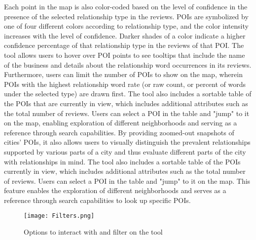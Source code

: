 Each point in the map is also color-coded based on the level of confidence in the presence of the selected relationship type in the reviews. POIs are symbolized by one of four different colors according to relationship type, and the color intensity increases with the level of confidence. Darker shades of a color indicate a higher confidence percentage of that relationship type in the reviews of that POI. The tool allows users to hover over POI points to see tooltips that include the name of the business and details about the relationship word occurrences in its reviews. Furthermore, users can limit the number of POIs to show on the map, wherein POIs with the highest relationship word rate (or raw count, or percent of words under the selected type) are drawn first. The tool also includes a sortable table of the POIs that are currently in view, which includes additional attributes such as the total number of reviews. Users can select a POI in the table and "jump" to it on the map, enabling exploration of different neighborhoods and serving as a reference through search capabilities. By providing zoomed-out snapshots of cities’ POIs, it also allows users to visually distinguish the prevalent relationships supported by various parts of a city and thus evaluate different parts of the city with relationships in mind. The tool also includes a sortable table of the POIs currently in view, which includes additional attributes such as the total number of reviews. Users can select a POI in the table and "jump" to it on the map. This feature enables the exploration of different neighborhoods and serves as a reference through search capabilities to look up specific POIs.

\begin{figure}
    \centering
    \texttt{[image: Filters.png]}
    \caption{Options to interact with and filter on the tool}
    \label{fig:my_label}
\end{figure}

